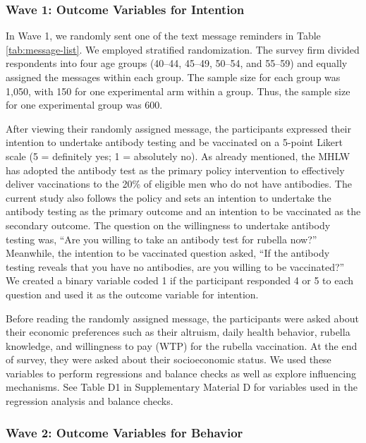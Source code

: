 \documentclass[
      12pt,
    a4paper
]{article}
\begin{document}
\hypertarget{wave1}{%
\subsubsection{Wave 1: Outcome Variables for Intention}\label{wave1}}

In Wave 1, we randomly sent one of the text message reminders in Table \ref{tab:message-list}. We employed stratified randomization. The survey firm divided respondents into four age groups (40--44, 45--49, 50--54, and 55--59) and equally assigned the messages within each group. The sample size for each group was 1,050, with 150 for one experimental arm within a group. Thus, the sample size for one experimental group was 600.

After viewing their randomly assigned message, the participants expressed their intention to undertake antibody testing and be vaccinated on a 5-point Likert scale (5 = definitely yes; 1 = absolutely no). As already mentioned, the MHLW has adopted the antibody test as the primary policy intervention to effectively deliver vaccinations to the 20\% of eligible men who do not have antibodies. The current study also follows the policy and sets an intention to undertake the antibody testing as the primary outcome and an intention to be vaccinated as the secondary outcome. The question on the willingness to undertake antibody testing was, ``Are you willing to take an antibody test for rubella now?'' Meanwhile, the intention to be vaccinated question asked, ``If the antibody testing reveals that you have no antibodies, are you willing to be vaccinated?'' We created a binary variable coded 1 if the participant responded 4 or 5 to each question and used it as the outcome variable for intention.

Before reading the randomly assigned message, the participants were asked about their economic preferences such as their altruism, daily health behavior, rubella knowledge, and willingness to pay (WTP) for the rubella vaccination. At the end of survey, they were asked about their socioeconomic status. We used these variables to perform regressions and balance checks as well as explore influencing mechanisms. See Table D1 in Supplementary Material D for variables used in the regression analysis and balance checks.

\hypertarget{wave2}{%
\subsubsection{Wave 2: Outcome Variables for Behavior}\label{wave2}}
\end{document}
